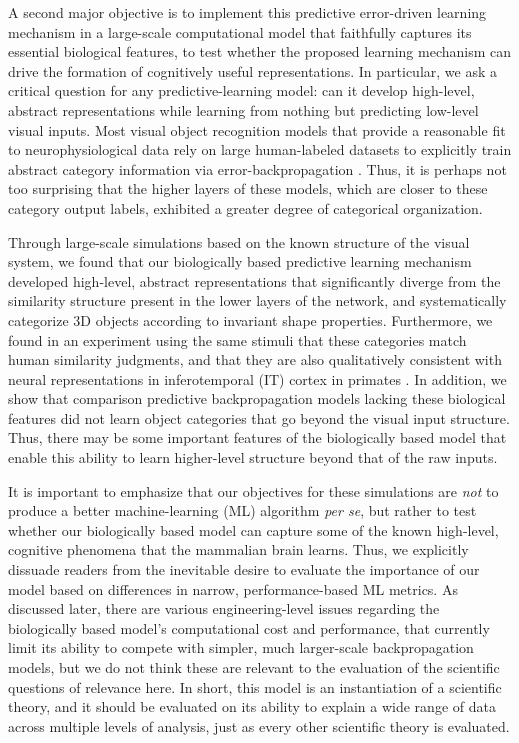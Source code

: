 \documentclass[11pt,twoside]{article}
\newif\myifpdf
\begin{document}
A second major objective is to implement this predictive error-driven learning mechanism in a large-scale computational model that faithfully captures its essential biological features, to test whether the proposed learning mechanism can drive the formation of cognitively useful representations.  In particular, we ask a critical question for any predictive-learning model: can it develop high-level, abstract representations while learning from nothing but predicting low-level visual inputs.  Most visual object recognition models that provide a reasonable fit to neurophysiological data rely on large human-labeled datasets to explicitly train abstract category information via error-backpropagation \citep{CadieuHongYaminsEtAl14,Khaligh-RazaviKriegeskorte14,RajalinghamIssaBashivanEtAl18}.  Thus, it is perhaps not too surprising that the higher layers of these models, which are closer to these category output labels, exhibited a greater degree of categorical organization.

Through large-scale simulations based on the known structure of the visual system, we found that our biologically based predictive learning mechanism developed high-level, abstract representations that significantly diverge from the similarity structure present in the lower layers of the network, and systematically categorize 3D objects according to invariant shape properties.  Furthermore, we found in an experiment using the same stimuli that these categories match human similarity judgments, and that they are also qualitatively consistent with neural representations in inferotemporal (IT) cortex in primates \citep{CadieuHongYaminsEtAl14}.  In addition, we show that comparison predictive backpropagation models lacking these biological features \citep{LotterKreimanCox16} did not learn object categories that go beyond the visual input structure.  Thus, there may be some important features of the biologically based model that enable this ability to learn higher-level structure beyond that of the raw inputs.

It is important to emphasize that our objectives for these simulations are \emph{not} to produce a better machine-learning (ML) algorithm \emph{per se}, but rather to test whether our biologically based model can capture some of the known high-level, cognitive phenomena that the mammalian brain learns.  Thus, we explicitly dissuade readers from the inevitable desire to evaluate the importance of our model based on differences in narrow, performance-based ML metrics.  As discussed later, there are various engineering-level issues regarding the biologically based model's computational cost and performance, that currently limit its ability to compete with simpler, much larger-scale backpropagation models, but we do not think these are relevant to the evaluation of the scientific questions of relevance here.  In short, this model is an instantiation of a scientific theory, and it should be evaluated on its ability to explain a wide range of data across multiple levels of analysis, just as every other scientific theory is evaluated.
\end{document}
